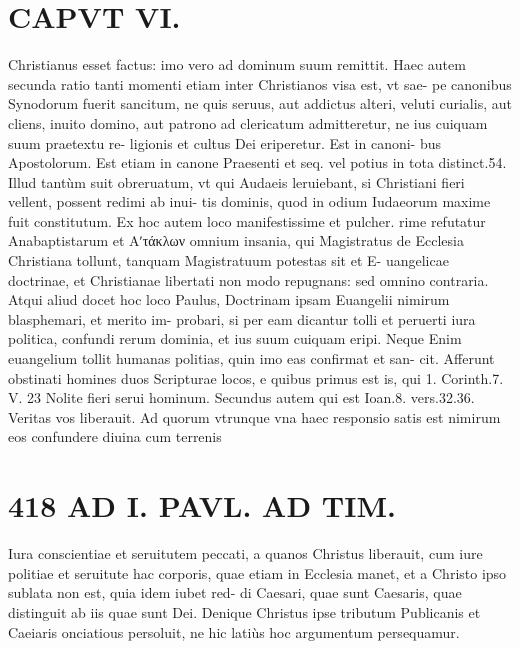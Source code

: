 \documentclass{article}
\begin{document}
\begin{pages}
\section*{CAPVT  VI. }
\marginpar{[ p.417 ]}\pstart Christianus esset factus: imo vero ad dominum suum remittit. Haec autem secunda ratio tanti momenti etiam inter Christianos visa est, vt sae- pe canonibus Synodorum fuerit sancitum, ne quis seruus, aut addictus alteri, veluti curialis, aut cliens, inuito domino, aut patrono ad clericatum admitteretur, ne ius cuiquam suum praetextu re- ligionis et cultus Dei eriperetur. Est in canoni- bus Apostolorum. Est etiam in canone Praesenti et seq. vel potius in tota distinct.54. Illud tantùm suit obreruatum, vt qui Audaeis leruiebant, si Christiani fieri vellent, possent redimi ab inui- tis dominis, quod in odium Iudaeorum maxime fuit constitutum.  \pend\pstart Ex hoc autem loco manifestissime et pulcher. rime refutatur Anabaptistarum et Αʹτάκλων omnium insania, qui Magistratus de Ecclesia Christiana tollunt, tanquam Magistratuum potestas sit et E- uangelicae doctrinae, et Christianae libertati non modo repugnans: sed omnino contraria. Atqui aliud docet hoc loco Paulus, Doctrinam ipsam Euangelii nimirum blasphemari, et merito im- probari, si per eam dicantur tolli et peruerti iura politica, confundi rerum dominia, et ius suum cuiquam eripi. Neque Enim euangelium tollit humanas politias, quin imo eas confirmat et san- cit.  \pend\pstart Afferunt obstinati homines duos Scripturae locos, e quibus primus est is, qui 1. Corinth.7. V. 23 Nolite fieri serui hominum. Secundus autem qui est Ioan.8. vers.32.36. Veritas vos liberauit. Ad quorum vtrunque vna haec responsio satis est nimirum eos confundere diuina cum terrenis  \pend
\section*{418 AD I. PAVL. AD TIM. }
\marginpar{[ p.]}\pstart Iura conscientiae et seruitutem peccati, a quanos Christus liberauit, cum iure politiae et seruitute hac corporis, quae etiam in Ecclesia manet, et a Christo ipso sublata non est, quia idem iubet red- di Caesari, quae sunt Caesaris, quae distinguit ab iis quae sunt Dei. Denique Christus ipse tributum Publicanis et Caeiaris onciatious persoluit, ne hic latiùs hoc argumentum persequamur.  \pend
{}
{}

\end{pages}
\end{document}
